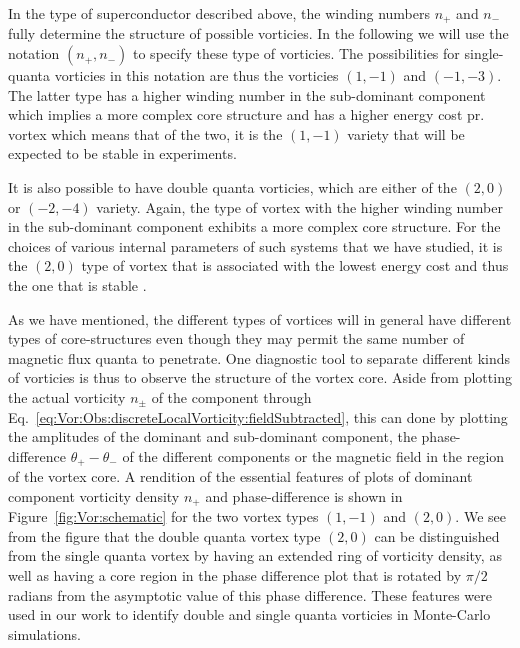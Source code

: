 In the type of superconductor described above, the winding numbers $n_+$ and $n_-$ fully determine the structure of possible vorticies. In the following we will use the
notation $(n_+,n_-)$ to specify these type of vorticies. The possibilities for single-quanta vorticies in this notation are thus the vorticies $(1, -1)$ and $(-1,-3)$.
The latter type has a higher winding number in the sub-dominant component which implies a more complex core structure and has a higher energy cost pr. vortex \cite{Garaud15}
which means that of the two, it is the $(1, -1)$ variety that will be expected to be stable in experiments.

It is also possible to have double quanta vorticies, which are either of the $(2, 0)$ or $(-2, -4)$ variety. Again, the type of vortex with the higher winding number in
the sub-dominant component exhibits a more complex core structure. For the choices of various internal parameters of such systems that we have studied, it is the $(2, 0)$
type of vortex that is associated with the lowest energy cost and thus the one that is stable \cite{AsleGaraud16,Garaud15,Sauls09}.

As we have mentioned, the different types of vortices will in general have different types of core-structures even though they may permit the same number of magnetic flux
quanta to penetrate. One diagnostic tool to separate different kinds of vorticies is thus to observe the structure of the vortex core. Aside from plotting the actual vorticity
$n_\pm$ of the component through Eq.~\eqref{eq:Vor:Obs:discreteLocalVorticity:fieldSubtracted}, this can done by \eg plotting
the amplitudes of the dominant and sub-dominant component, the phase-difference $\theta_+-\theta_-$ of the different components or the magnetic field in the region of
the vortex core. A rendition of the essential features of plots of dominant component vorticity density $n_+$ and phase-difference is shown in Figure~\ref{fig:Vor:schematic} for the
two vortex types $(1,-1)$ and $(2,0)$. We see from the figure that the double quanta vortex type $(2,0)$ can be distinguished from the single quanta vortex by having an
extended ring of vorticity density, as well as having a core region in the phase difference plot that is rotated by $\pi/2$ radians from the asymptotic value of this phase difference.
These features were used in our work to identify double and single quanta vorticies in Monte-Carlo simulations.

